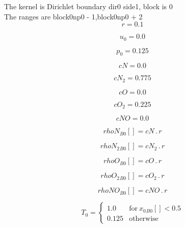 \documentclass{article}
\begin{document}
\noindent The kernel is Dirichlet boundary dir0 side1, block is 0\\\noindent The ranges are block0np0 - 1,block0np0 + 2\\\begin{dmath}r = 0.1\end{dmath}

\begin{dmath}u_{0} = 0.0\end{dmath}

\begin{dmath}p_{0} = 0.125\end{dmath}

\begin{dmath}cN = 0.0\end{dmath}

\begin{dmath}cN_{2} = 0.775\end{dmath}

\begin{dmath}cO = 0.0\end{dmath}

\begin{dmath}cO_{2} = 0.225\end{dmath}

\begin{dmath}cNO = 0.0\end{dmath}

\begin{dmath}{rhoN{_{B0}}}[{}] = cN \,.\, r\end{dmath}

\begin{dmath}{rhoN_{2}{_{B0}}}[{}] = cN_{2} \,.\, r\end{dmath}

\begin{dmath}{rhoO{_{B0}}}[{}] = cO \,.\, r\end{dmath}

\begin{dmath}{rhoO_{2}{_{B0}}}[{}] = cO_{2} \,.\, r\end{dmath}

\begin{dmath}{rhoNO{_{B0}}}[{}] = cNO \,.\, r\end{dmath}

\begin{dmath}T_{0} = \begin{cases} 1.0 & \text{for}\: {x_{0}{_{B0}}}[{}] < 0.5 \\0.125 & \text{otherwise} \end{cases}\end{dmath}
\end{document}
